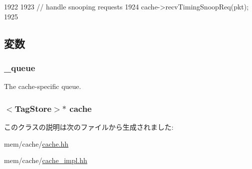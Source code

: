 \begin{DoxyCode}
1922 {
1923     // handle snooping requests
1924     cache->recvTimingSnoopReq(pkt);
1925 }
\end{DoxyCode}


\subsection{変数}
\hypertarget{classCache_1_1MemSidePort_a3a20f77334fdfcb8ec2e8cccd925f95f}{
\subsubsection[{\_\-queue}]{ {\bf \_\-queue}}}
\label{classCache_1_1MemSidePort_a3a20f77334fdfcb8ec2e8cccd925f95f}
The cache-\/specific queue. \hypertarget{classCache_1_1MemSidePort_ae1a869e306f5bc5028f706229d68aba1}{
\subsubsection[{cache}]{$<$TagStore$>$$\ast$ {\bf cache}}}
\label{classCache_1_1MemSidePort_ae1a869e306f5bc5028f706229d68aba1}


このクラスの説明は次のファイルから生成されました:\begin{DoxyCompactItemize}
\item 
mem/cache/\hyperlink{cache_8hh}{cache.hh}\item 
mem/cache/\hyperlink{cache__impl_8hh}{cache\_\-impl.hh}\end{DoxyCompactItemize}
